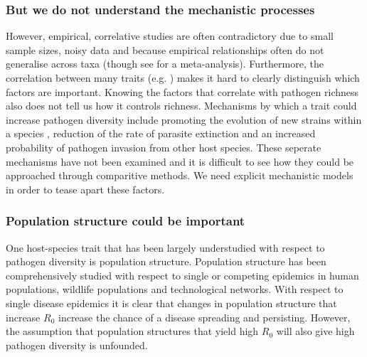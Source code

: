 \subsubsection{But we do not understand the mechanistic processes}

However, empirical, correlative studies are often contradictory due to small sample sizes, noisy data and because empirical relationships often do not generalise across taxa (though see \cite{kamiya2014determines} for a meta-analysis).
Furthermore, the correlation between many traits (e.g. \cite{nunn2015infectious}) makes it hard to clearly distinguish which factors are important.
Knowing the factors that correlate with pathogen richness also does not tell us how it controls richness. 
Mechanisms by which a trait could increase pathogen diversity include promoting the evolution of new strains within a species \cite{buckee2004effects}, reduction of the rate of parasite extinction and an increased probability of pathogen invasion from other host species.
These seperate mechanisms have not been examined and it is difficult to see how they could be approached through comparitive methods.
We need explicit mechanistic models in order to tease apart these factors.





\subsubsection{Population structure could be important}
One host-species trait that has been largely understudied with respect to pathogen diversity is population structure.
Population structure has been comprehensively studied with respect to single or competing epidemics in human populations, wildlife populations and technological networks.
With respect to single disease epidemics it is clear that changes in population structure that increase $R_0$ increase the chance of a disease spreading and persisting.
However, the assumption that population structures that yield high $R_0$ will also give high pathogen diversity \cite{nunn2003comparative} is unfounded.



